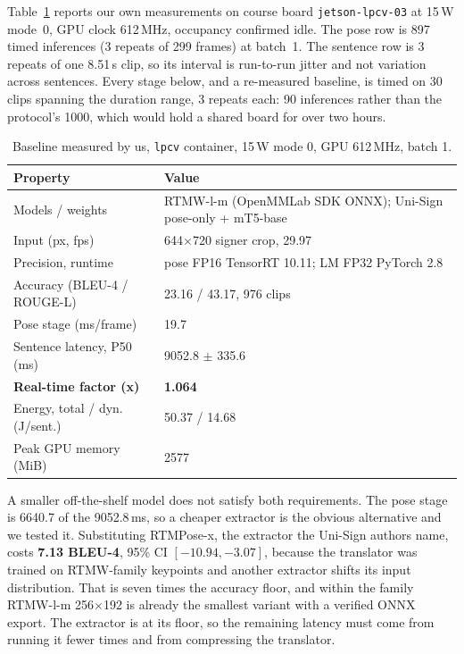\documentclass[conference]{IEEEtran}
\begin{document}
Table~\ref{tab:baseline} reports our own measurements on course board
\texttt{jetson-lpcv-03} at 15\,W mode~0, GPU clock 612\,MHz, occupancy confirmed idle. The
pose row is 897 timed inferences (3 repeats of 299 frames) at batch~1. The sentence row is
3 repeats of one 8.51\,s clip, so its interval is run-to-run jitter and not variation
across sentences. Every stage below, and a re-measured baseline, is timed on 30 clips
spanning the duration range, 3 repeats each: 90 inferences rather than the protocol's
1000, which would hold a shared board for over two hours.

\begin{table}[t]
\caption{Baseline measured by us, \texttt{lpcv} container, 15\,W mode 0, GPU 612\,MHz, batch 1.}
\label{tab:baseline}
\centering
\scriptsize
\setlength{\tabcolsep}{3pt}
\begin{tabular}{@{}p{}p{}@{}}
\toprule
\textbf{Property} & \textbf{Value} \\
\midrule
Models / weights & RTMW-l-m (OpenMMLab SDK ONNX); Uni-Sign pose-only + mT5-base \\
Input (px, fps) & 644$\times$720 signer crop, 29.97 \\
Precision, runtime & pose FP16 TensorRT 10.11; LM FP32 PyTorch 2.8 \\
Accuracy (BLEU-4 / ROUGE-L) & 23.16 / 43.17, 976 clips \\
Pose stage (ms/frame) & 19.7 \\
Sentence latency, P50 (ms) & 9052.8 $\pm$ 335.6 \\
\textbf{Real-time factor (x)} & \textbf{1.064} \\
Energy, total / dyn. (J/sent.) & 50.37 / 14.68 \\
Peak GPU memory (MiB) & 2577 \\
\bottomrule
\end{tabular}
\end{table}

A smaller off-the-shelf model does not satisfy both requirements. The pose stage is 6640.7 of the 9052.8\,ms, so a cheaper extractor is the
obvious alternative and we tested it. Substituting RTMPose-x, the extractor the Uni-Sign
authors name, costs \textbf{7.13 BLEU-4}, 95\% CI $[-10.94, -3.07]$, because the
translator was trained on RTMW-family keypoints and another extractor shifts its input
distribution. That is seven times the accuracy floor, and within the family RTMW-l-m
256$\times$192 is already the smallest variant with a verified ONNX export. The
extractor is at its floor, so the remaining latency must come from running it fewer times
and from compressing the translator.
\end{document}
